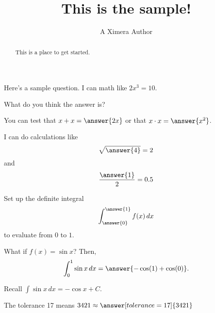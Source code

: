 \documentclass{ximera}
\title{This is the sample!}
\author{A Ximera Author}
\begin{document}
\begin{abstract}
  This is a place to get started.
\end{abstract}
\maketitle

Here's a sample question.  I can math like $2x^3 = 10$.

\begin{problem}
  What do you think the answer is?

  \begin{multipleChoice}
  \end{multipleChoice}
\end{problem}

\begin{problem}
  \begin{multipleChoice}
  \end{multipleChoice}
\end{problem}

\begin{problem}
  You can test that $x + x = \answer{2x}$
  or that $x \cdot x = \answer{x^2}$.

  I can do calculations like 
  \[
    \sqrt{\answer{4}} = 2
  \]
  and
  \[
    \frac{\answer{1}}{2} = 0.5
  \]
\end{problem}

\begin{problem}
  Set up the definite integral
    \[
      \int_{\answer{0}}^{\answer{1}} f(x) \, dx
    \]
  to evaluate from $0$ to $1$.

  \begin{question}
    What if $f(x) = \sin x$?  Then,
    \[
       \int_0^1 \sin x \, dx = \answer{-\cos(1) + \cos(0)}.
    \]

    \begin{hint}
      Recall $\int \sin x \, dx = -\cos x + C$.
    \end{hint}
  \end{question}
\end{problem}

\begin{problem}
   The tolerance 17 means $3421 \approx \answer[tolerance=17]{3421}$
\end{problem}
\end{document}

